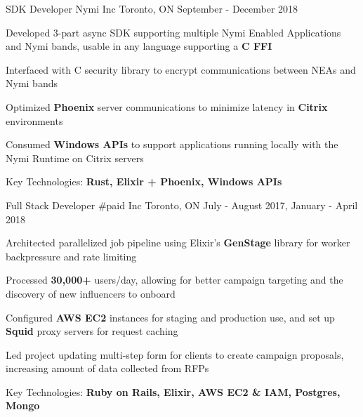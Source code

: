 

\begin{cventries}

  \cventry
    {SDK Developer} %
    {Nymi Inc} %
    {Toronto, ON} %
    {September - December 2018} %
    {
      \begin{cvitems} %
        \item {Developed 3-part async SDK supporting multiple Nymi Enabled Applications and Nymi bands, usable in any language supporting a \textbf{C FFI}}
        \item {Interfaced with C security library to encrypt communications between NEAs and Nymi bands}
        \item {Optimized \textbf{Phoenix} server communications to minimize latency in \textbf{Citrix} environments}
        \item {Consumed \textbf{Windows APIs} to support applications running locally with the Nymi Runtime on Citrix servers}
        \item {Key Technologies: \textbf{Rust, Elixir + Phoenix, Windows APIs}}
      \end{cvitems}
    }

  \cventry
    {Full Stack Developer} %
    {\#paid Inc} %
    {Toronto, ON} %
    {July - August 2017, January - April 2018} %
    {
      \begin{cvitems} %
        \item {Architected parallelized job pipeline using Elixir's \textbf{GenStage} library for worker backpressure and rate limiting}
        \item {Processed \textbf{30,000+} users/day, allowing for better campaign targeting and the discovery of new influencers to onboard}
        \item {Configured \textbf{AWS EC2} instances for staging and production use, and set up \textbf{Squid} proxy servers for request caching}
        \item {Led project updating multi-step form for clients to create campaign proposals, increasing amount of data collected from RFPs}
        \item {Key Technologies: \textbf{Ruby on Rails, Elixir, AWS EC2 \& IAM, Postgres, Mongo}}
      \end{cvitems}
    }

\end{cventries}
